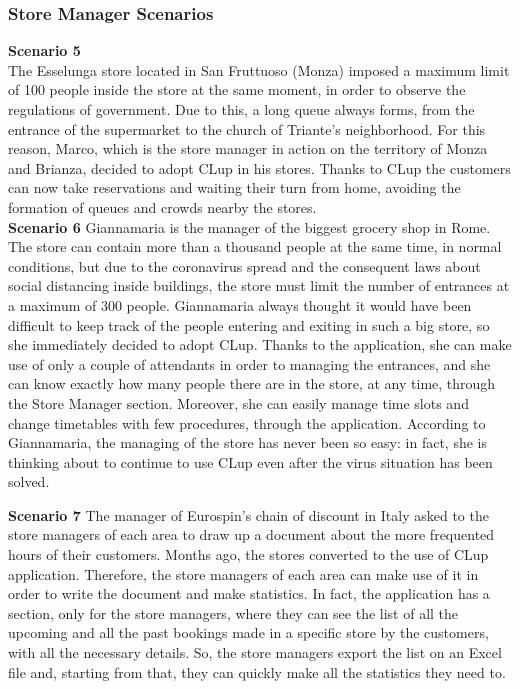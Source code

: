 \documentclass[table, 12pt]{article}
\begin{document}
\subsubsection{Store Manager Scenarios}
\textbf{Scenario 5}\\
The Esselunga store located in San Fruttuoso (Monza) imposed a maximum limit of 100 people inside the store at the same moment, in order to observe the regulations of government. Due to this, a long queue always forms, from the entrance of the supermarket to the church of Triante's neighborhood. For this reason, Marco, which is the store manager in action on the territory of Monza and Brianza, decided to adopt CLup in his stores.
Thanks to CLup the customers can now take reservations and waiting their turn from home, avoiding the formation of queues and crowds nearby the stores.\\

\textbf{Scenario 6}
Giannamaria is the manager of the biggest grocery shop in Rome. The store can contain more than a thousand people at the same time, in normal conditions, but due to the coronavirus spread and the consequent laws about social distancing inside buildings, the store must limit the number of entrances at a maximum of 300 people. Giannamaria always thought it would have been difficult to keep track of the people entering and exiting in such a big store, so she immediately decided to adopt CLup. Thanks to the application, she can make use of only a couple of attendants in order to managing the entrances, and she can know exactly how many people there are in the store, at any time, through the Store Manager section. Moreover, she can easily manage time slots and change timetables with few procedures, through the application. According to Giannamaria, the managing of the store has never been so easy: in fact, she is thinking about to continue to use CLup even after the virus situation has been solved.

\textbf{Scenario 7}
The manager of Eurospin's chain of discount in Italy asked to the store managers of each area to draw up a document about the more frequented hours of their customers. Months ago, the stores converted to the use of CLup application. Therefore, the store managers of each area can make use of it in order to write the document and make statistics. In fact, the application has a section, only for the store managers, where they can see the list of all the upcoming and all the past bookings made in a specific store by the customers, with all the necessary details. So, the store managers export the list on an Excel file and, starting from that, they can quickly make all the statistics they need to.
\end{document}
